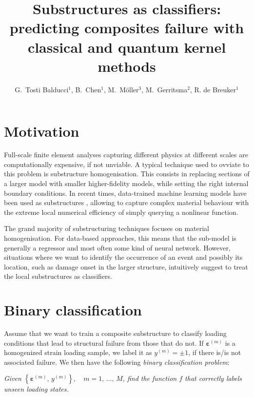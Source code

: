 \documentclass[9pt,a4paper]{extarticle}
\title{%
Substructures as classifiers: predicting composites failure with\\ classical and quantum kernel methods%
}
\author{%
G.\ Tosti Balducci$^1$, B.\ Chen$^1$,
M.\ M\"{o}ller$^3$, M.\ Gerritsma$^2$,
R. de Breuker$^1$%
}
\affiliation{%
$^1$ TU Delft, Aerospace Structures and Materials\\%
$^2$ TU Delft, Flow Physics and Technology\\%
$^3$ TU Delft, Applied Mathematics%
}
\begin{document}
\maketitle
\begin{multicols}{2}

\section{Motivation}
Full-scale finite element analyses capturing different physics at different scales are computationally expensive, if not unviable. A typical technique used to ovviate to this problem is substructure homogenisation. This consists in replacing sections of a larger model with smaller higher-fidelity models, while setting the right internal boundary conditions. In recent times, data-trained machine learning models have been used as substructures \cite{TGullikers}, allowing to capture complex material behaviour with the extreme local numerical efficiency of simply querying a nonlinear function.

The grand majority of substructuring techniques focuses on material homogenisation. For data-based approaches, this means that the sub-model is generally a regressor and most often some kind of neural network. However, situations where we want to identify the occurrence of an event and possibly its location, such as damage onset in the larger structure, intuitively suggest to treat the local substructures as classifiers.

\section{Binary classification}
Assume that we want to train a composite substructure to classify loading conditions that lead to structural failure from those that do not. If $\bm{\varepsilon}^{(m)}$ is a homogenized strain loading sample, we label it as $y^{(m)} = \pm 1$, if there is/is not associated failure. We then have the following \emph{binary classification problem}:
\begin{center}
    \emph{
    Given $\left\{ \bm{\varepsilon}^{(m)},\, y^{(m)}\right\},\quad m=1,\,\dots,\, M$, find the function $f$ that correctly labels unseen loading states.
    }
\end{center}


\end{multicols}
\end{document}
